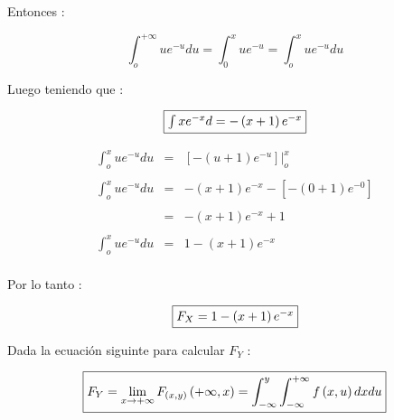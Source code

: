 \documentclass[12pt]{article}
\begin{document}
    Entonces :

    \begin{equation*}
        \int_{o}^{+\infty} ue^{-u}du = \int_{0}^{x}ue^{-u} = \int_{o}^{x}   ue^{-u} du
    \end{equation*}
    
    Luego teniendo que :
    
    \begin{equation*}
       \fbox{$
        \int xe^{-x}d = -\left(x+1\right)e^{-x}
        $}
    \end{equation*}

    \begin{equation*}
        \begin{array}{rcl}
            \int_{o}^{x} ue^{-u}du & = & \displaystyle  [-\left(u+1\right)e^{-u}]\vert_{o}^{x}
            \\
            \\
            \int_{o}^{x} ue^{-u}du & = & \displaystyle -\left(x+1\right)e^{-x} - [-\left(0+1\right)e^{-0}]
            \\
            \\
            & = & -\left(x+1\right)e^{-x}+1
            \\
            \\
            \int_{o}^{x} ue^{-u}du & = & 1 -\left(x+1\right)e^{-x} 
            \\
        \end{array}
    \end{equation*}

    Por lo tanto :

    \begin{equation*}
       \fbox{$F_{X} = 1 - \left(x+1\right)e^{-x}$}
    \end{equation*}

    Dada la ecuaci\'on siguinte para calcular $F_{Y}$ :

    \begin{equation*} 
        \fbox{$
            F_{Y} = \displaystyle\lim_{x\to+\infty} F_{\left(x,y\right)}\left(+\infty,x\right)=\int_{-\infty}^{y} \int_{-\infty}^{+\infty} f\left(x,u\right) dx du
        $}
    \end{equation*} 
\end{document}
